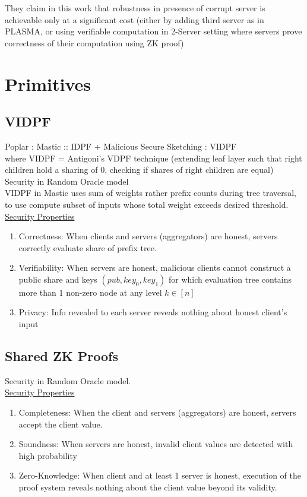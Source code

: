 They claim in this work that robustness in presence of corrupt server is achievable only at a significant cost (either by adding third server as in PLASMA, or using verifiable computation in 2-Server setting where servers prove correctness of their computation using ZK proof)

\section{Primitives}
\subsection{VIDPF}
Poplar : Mastic :: IDPF + Malicious Secure Sketching : VIDPF \\

where VIDPF = Antigoni's VDPF technique (extending leaf layer such that right children hold a sharing of 0, checking if shares of right children are equal) \\

Security in Random Oracle model \\

VIDPF in Mastic uses sum of weights rather prefix counts during tree traversal, to use compute subset of inputs whose total weight exceeds desired threshold. \\

\underline{Security Properties}
\begin{enumerate}
    \item Correctness: When clients and servers (aggregators) are honest, servers correctly evaluate share of prefix tree.
    \item Verifiability: When servers are honest, malicious clients cannot construct a public share and keys $(pub, key_0, key_1)$ for which evaluation tree contains more than 1 non-zero node at any level $k \in [n]$
    \item Privacy: Info revealed to each server reveals nothing about honest client's input
\end{enumerate}

\subsection{Shared ZK Proofs}
Security in Random Oracle model. \\

\underline{Security Properties}
\begin{enumerate}
    \item Completeness: When the client and servers (aggregators) are honest, servers accept the client value. 
    \item Soundness: When servers are honest, invalid client values are detected with high probability
    \item Zero-Knowledge: When client and at least 1 server is honest, execution of the proof system reveals nothing about the client value beyond its validity.
\end{enumerate}

